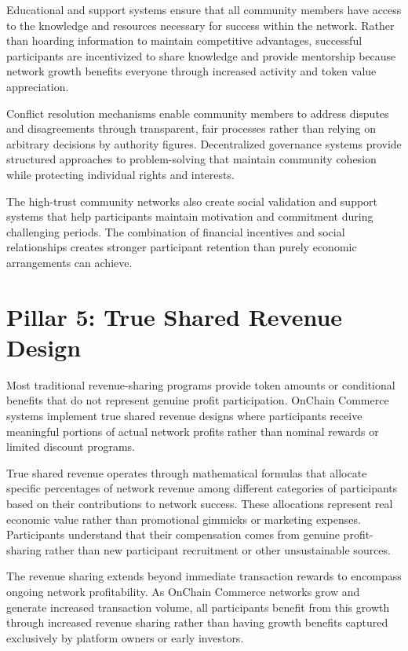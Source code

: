 \documentclass[
  Letterpaper,
]{scrbook}
\begin{document}
Educational and support systems ensure that all community members have
access to the knowledge and resources necessary for success within the
network. Rather than hoarding information to maintain competitive
advantages, successful participants are incentivized to share knowledge
and provide mentorship because network growth benefits everyone through
increased activity and token value appreciation.

Conflict resolution mechanisms enable community members to address
disputes and disagreements through transparent, fair processes rather
than relying on arbitrary decisions by authority figures. Decentralized
governance systems provide structured approaches to problem-solving that
maintain community cohesion while protecting individual rights and
interests.

The high-trust community networks also create social validation and
support systems that help participants maintain motivation and
commitment during challenging periods. The combination of financial
incentives and social relationships creates stronger participant
retention than purely economic arrangements can achieve.

\section{Pillar 5: True Shared Revenue
Design}\label{pillar-5-true-shared-revenue-design}

Most traditional revenue-sharing programs provide token amounts or
conditional benefits that do not represent genuine profit participation.
OnChain Commerce systems implement true shared revenue designs where
participants receive meaningful portions of actual network profits
rather than nominal rewards or limited discount programs.

True shared revenue operates through mathematical formulas that allocate
specific percentages of network revenue among different categories of
participants based on their contributions to network success. These
allocations represent real economic value rather than promotional
gimmicks or marketing expenses. Participants understand that their
compensation comes from genuine profit-sharing rather than new
participant recruitment or other unsustainable sources.

The revenue sharing extends beyond immediate transaction rewards to
encompass ongoing network profitability. As OnChain Commerce networks
grow and generate increased transaction volume, all participants benefit
from this growth through increased revenue sharing rather than having
growth benefits captured exclusively by platform owners or early
investors.
\end{document}
